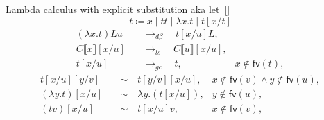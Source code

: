 \documentclass[aspectratio=169]{beamer}
\begin{document}
\begin{frame}{Lambda calculus with explicit substitution aka let~[\cite{Standardisation}]}
\[t \coloneqq x \mid t t \mid \lambda x. t \mid t [x/t]\]
\vfill
\begin{align*}
	(\lambda x. t) L u              \quad & \to_{d\beta} \quad t[x/u] L,                                                \\
	C \llbracket x \rrbracket [x/u] \quad & \to_{ls} \quad C \llbracket u \rrbracket [x/u],                             \\
	t [x/u]                         \quad & \to_{gc} \quad t,                               & x \notin \textsf{fv} (t),
\end{align*}
\vfill
\begin{align}
	t [x/u] [y/v] \quad        & \sim \quad t [y/v] [x/u],        & x \notin \textsf{fv} (v) \land y \notin \textsf{fv} (u), \nonumber \\
	\label{eq:subst-lambda}
	(\lambda y. t) [x/u] \quad & \sim \quad \lambda y. (t [x/u]), & y \notin \textsf{fv} (u), \tag{$\ast$}                             \\
	(t v) [x/u] \quad          & \sim \quad t [x/u] v,            & x \notin \textsf{fv} (v), \nonumber
\end{align}
\end{frame}
\end{document}
